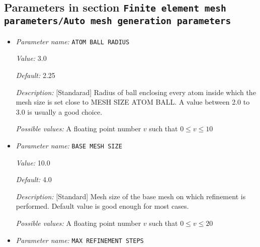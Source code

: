 \subsection{Parameters in section \tt Finite element mesh parameters/Auto mesh generation parameters}
\label{parameters:Finite_20element_20mesh_20parameters/Auto_20mesh_20generation_20parameters}

\begin{itemize}
\item {\it Parameter name:} {\tt ATOM BALL RADIUS}
\label{parameters:Finite element mesh parameters/Auto mesh generation parameters/ATOM BALL RADIUS}
\label{parameters:Finite_20element_20mesh_20parameters/Auto_20mesh_20generation_20parameters/ATOM_20BALL_20RADIUS}


{\it Value:} 3.0


{\it Default:} 2.25


{\it Description:} [Standarad] Radius of ball enclosing every atom inside which the mesh size is set close to MESH SIZE ATOM BALL. A value between 2.0 to 3.0 is usually a good choice.


{\it Possible values:} A floating point number $v$ such that $0 \leq v \leq 10$
\item {\it Parameter name:} {\tt BASE MESH SIZE}
\label{parameters:Finite element mesh parameters/Auto mesh generation parameters/BASE MESH SIZE}
\label{parameters:Finite_20element_20mesh_20parameters/Auto_20mesh_20generation_20parameters/BASE_20MESH_20SIZE}


{\it Value:} 10.0


{\it Default:} 4.0


{\it Description:} [Standard] Mesh size of the base mesh on which refinement is performed. Default value is good enough for most cases.


{\it Possible values:} A floating point number $v$ such that $0 \leq v \leq 20$
\item {\it Parameter name:} {\tt MAX REFINEMENT STEPS}
\label{parameters:Finite element mesh parameters/Auto mesh generation parameters/MAX REFINEMENT STEPS}
\label{parameters:Finite_20element_20mesh_20parameters/Auto_20mesh_20generation_20parameters/MAX_20REFINEMENT_20STEPS}



\end{itemize}
